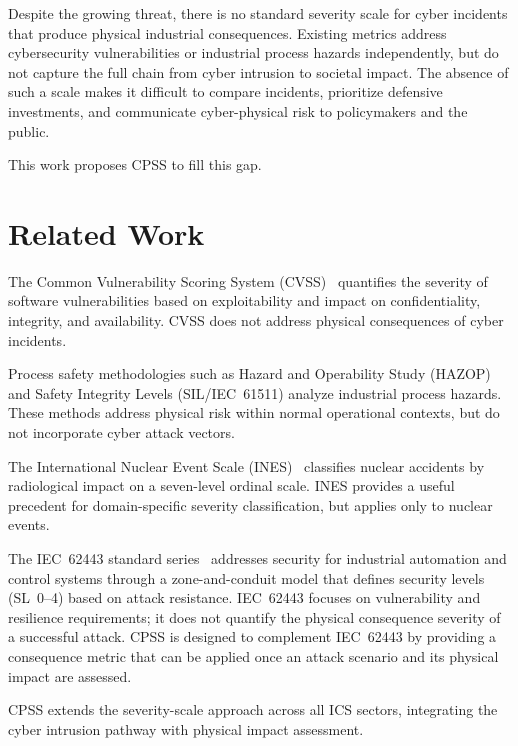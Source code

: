 \documentclass[11pt]{article}
\begin{document}
Despite the growing threat, there is no standard severity scale for
cyber incidents that produce physical industrial consequences.
Existing metrics address cybersecurity vulnerabilities or industrial
process hazards independently, but do not capture the full chain from
cyber intrusion to societal impact.
The absence of such a scale makes it difficult to compare incidents,
prioritize defensive investments, and communicate cyber-physical risk
to policymakers and the public.

This work proposes CPSS to fill this gap.

\section{Related Work}

The Common Vulnerability Scoring System (CVSS)~\cite{cvss} quantifies
the severity of software vulnerabilities based on exploitability and
impact on confidentiality, integrity, and availability.
CVSS does not address physical consequences of cyber incidents.

Process safety methodologies such as Hazard and Operability Study
(HAZOP)~\cite{hazop} and Safety Integrity Levels (SIL/IEC~61511)
analyze industrial process hazards.
These methods address physical risk within normal operational contexts,
but do not incorporate cyber attack vectors.

The International Nuclear Event Scale (INES)~\cite{ines} classifies
nuclear accidents by radiological impact on a seven-level ordinal scale.
INES provides a useful precedent for domain-specific severity
classification, but applies only to nuclear events.

The IEC~62443 standard series~\cite{iec62443} addresses security for
industrial automation and control systems through a zone-and-conduit
model that defines security levels (SL~0--4) based on attack resistance.
IEC~62443 focuses on vulnerability and resilience requirements;
it does not quantify the physical consequence severity of a successful
attack. CPSS is designed to complement IEC~62443 by providing a
consequence metric that can be applied once an attack scenario and
its physical impact are assessed.

CPSS extends the severity-scale approach across all ICS sectors,
integrating the cyber intrusion pathway with physical impact assessment.
\end{document}
